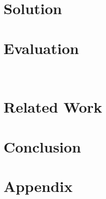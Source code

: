 \section{Solution}

%
\section{Evaluation}~\label{sec:eval}

%
\vspace{-3em}
\section{Related Work}


\section{Conclusion}










\newpage
\section{Appendix}




